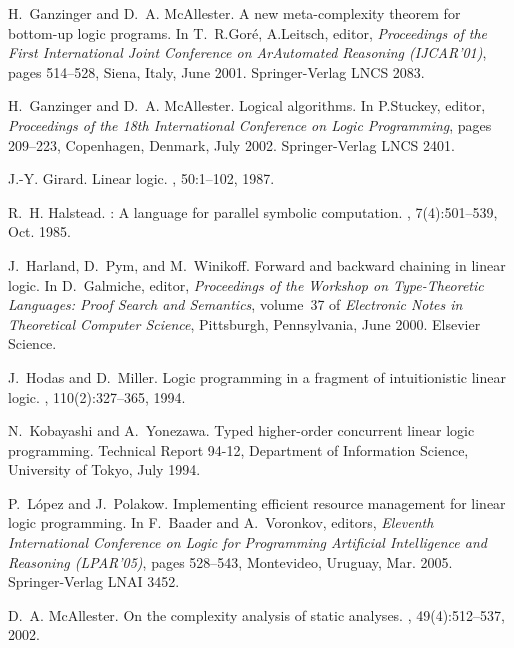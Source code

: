 \documentclass{sig-alt}
\begin{document}
\begin{thebibliography}{50}
H.~Ganzinger and D.~A. McAllester.
\newblock A new meta-complexity theorem for bottom-up logic programs.
\newblock In T.~R.Gor{\'e}, A.Leitsch, editor, {\em Proceedings of the First
  International Joint Conference on ArAutomated Reasoning (IJCAR'01)}, pages
  514--528, Siena, Italy, June 2001. Springer-Verlag LNCS 2083.

H.~Ganzinger and D.~A. McAllester.
\newblock Logical algorithms.
\newblock In P.Stuckey, editor, {\em Proceedings of the 18th International
  Conference on Logic Programming}, pages 209--223, Copenhagen, Denmark, July
  2002. Springer-Verlag LNCS 2401.

J.-Y. Girard.
\newblock Linear logic.
, 50:1--102, 1987.

R.~H. Halstead.
: A language for parallel symbolic computation.
,
  7(4):501--539, Oct. 1985.

J.~Harland, D.~Pym, and M.~Winikoff.
\newblock Forward and backward chaining in linear logic.
\newblock In D.~Galmiche, editor, {\em Proceedings of the Workshop on
  Type-Theoretic Languages: Proof Search and Semantics}, volume~37 of {\em
  Electronic Notes in Theoretical Computer Science}, Pittsburgh, Pennsylvania,
  June 2000. Elsevier Science.

J.~Hodas and D.~Miller.
\newblock Logic programming in a fragment of intuitionistic linear logic.
, 110(2):327--365, 1994.

N.~Kobayashi and A.~Yonezawa.
\newblock Typed higher-order concurrent linear logic programming.
\newblock Technical Report 94-12, Department of Information Science, University
  of Tokyo, July 1994.

P.~L\'{o}pez and J.~Polakow.
\newblock Implementing efficient resource management for linear logic
  programming.
\newblock In F.~Baader and A.~Voronkov, editors, {\em Eleventh International
  Conference on Logic for Programming Artificial Intelligence and Reasoning
  (LPAR'05)}, pages 528--543, Montevideo, Uruguay, Mar. 2005. Springer-Verlag
  LNAI 3452.

D.~A. McAllester.
\newblock On the complexity analysis of static analyses.
, 49(4):512--537, 2002.


\end{thebibliography}
\end{document}
